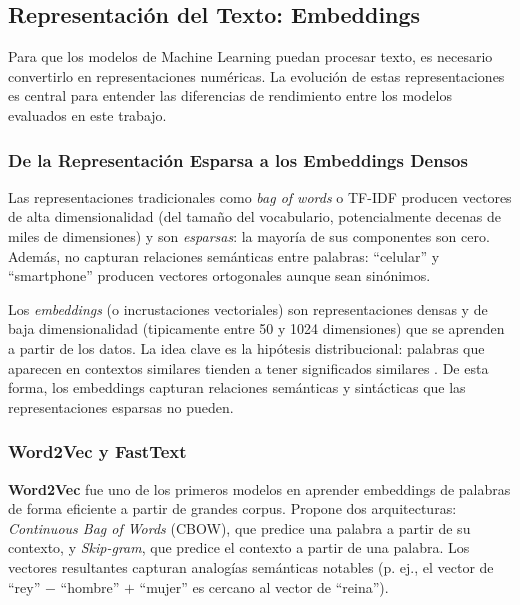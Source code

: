 \documentclass[11pt,a4paper]{article}
\begin{document}
\subsection{Representación del Texto: Embeddings}
\label{sec:embeddings}

Para que los modelos de Machine Learning puedan procesar texto, es necesario convertirlo en representaciones numéricas. La evolución de estas representaciones es central para entender las diferencias de rendimiento entre los modelos evaluados en este trabajo.

\subsubsection{De la Representación Esparsa a los Embeddings Densos}

Las representaciones tradicionales como \emph{bag of words} o TF-IDF producen vectores de alta dimensionalidad (del tamaño del vocabulario, potencialmente decenas de miles de dimensiones) y son \emph{esparsas}: la mayoría de sus componentes son cero. Además, no capturan relaciones semánticas entre palabras: ``celular'' y ``smartphone'' producen vectores ortogonales aunque sean sinónimos.

Los \emph{embeddings} (o incrustaciones vectoriales) son representaciones densas y de baja dimensionalidad (tipicamente entre 50 y 1024 dimensiones) que se aprenden a partir de los datos. La idea clave es la hipótesis distribucional: palabras que aparecen en contextos similares tienden a tener significados similares \cite{jurafsky2024}. De esta forma, los embeddings capturan relaciones semánticas y sintácticas que las representaciones esparsas no pueden.

\subsubsection{Word2Vec y FastText}

\textbf{Word2Vec} \cite{mikolov2013} fue uno de los primeros modelos en aprender embeddings de palabras de forma eficiente a partir de grandes corpus. Propone dos arquitecturas: \textit{Continuous Bag of Words} (CBOW), que predice una palabra a partir de su contexto, y \textit{Skip-gram}, que predice el contexto a partir de una palabra. Los vectores resultantes capturan analogías semánticas notables (p. ej., el vector de ``rey'' $-$ ``hombre'' $+$ ``mujer'' es cercano al vector de ``reina'').
\end{document}
